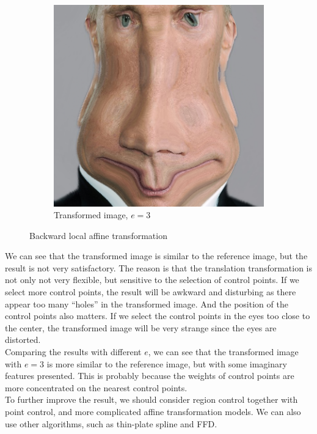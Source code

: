 \documentclass[UTF8]{ctexart}
\begin{document}
\begin{figure}[htbp]
\begin{subfigure}{0.3\textwidth}
        \includegraphics[width=\linewidth]{putinreg3.png}
        \caption{Transformed image, $e=3$}
    \end{subfigure}%
    \caption{Backward local affine transformation}
    \label{fig:aff}
\end{figure}

We can see that the transformed image is similar to the reference image, but the result is not very satisfactory.
The reason is that the translation transformation is not only not very flexible, but sensitive to the selection of control points.
If we select more control points, the result will be awkward and disturbing as there appear too many ``holes'' in the transformed image.
And the position of the control points also matters. If we select the control points in the eyes too close to the center,
the transformed image will be very strange since the eyes are distorted.\\
Comparing the results with different $e$, we can see that the transformed image with $e=3$ is more similar to the reference image, but
with some imaginary features presented. This is probably because the weights of control points are more concentrated on the nearest control points.\\
To further improve the result, we should consider region control together with point control, and more complicated affine transformation models.
We can also use other algorithms, such as thin-plate spline and FFD. 
\end{document}
